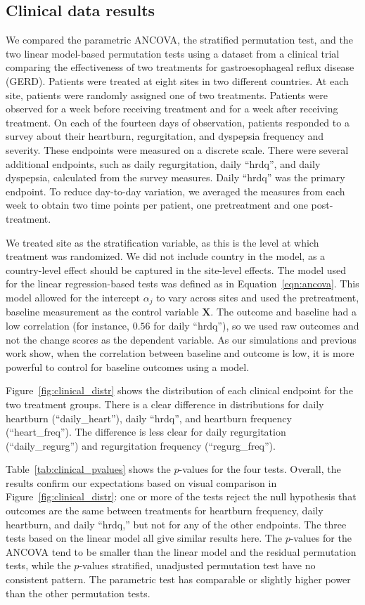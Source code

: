 \documentclass[11pt]{article}
\begin{document}
\subsection*{Clinical data results}
We compared the parametric ANCOVA, the stratified permutation test, and the two linear model-based permutation tests using a dataset from a clinical trial comparing the effectiveness of two treatments for gastroesophageal reflux disease (GERD).
Patients were treated at eight sites in two different countries.
At each site, patients were randomly assigned one of two treatments.
Patients were observed for a week before receiving treatment and for a week after receiving treatment.
On each of the fourteen days of observation, patients responded to a survey about their heartburn, regurgitation, and dyspepsia frequency and severity.
These endpoints were measured on a discrete scale.
There were several additional endpoints, such as daily regurgitation, daily ``hrdq'', and daily dyspepsia, calculated from the survey measures.
Daily ``hrdq'' was the primary endpoint.
To reduce day-to-day variation, we averaged the measures from each week to obtain two time points per patient, one pretreatment and one post-treatment.

We treated site as the stratification variable, as this is the level at which treatment was randomized.
We did not include country in the model, as a country-level effect should be captured in the site-level effects.
The model used for the linear regression-based tests was defined as in Equation~\ref{eqn:ancova}.
This model allowed for the intercept $\alpha_j$ to vary across sites and used the pretreatment, baseline measurement as the control variable $\mathbf{X}$.
The outcome and baseline had a low correlation (for instance, $0.56$ for daily ``hrdq''), so we used raw outcomes and not the change scores as the dependent variable. 
As our simulations and previous work \cite{frison_repeated_1992} show, when the correlation between baseline and outcome is low, it is more powerful to control for baseline outcomes using a model.

Figure~\ref{fig:clinical_distr} shows the distribution of each clinical endpoint for the two treatment groups.
There is a clear difference in distributions for daily heartburn (``daily\_heart''), daily ``hrdq'', and heartburn frequency (``heart\_freq'').
The difference is less clear for daily regurgitation (``daily\_regurg'') and regurgitation frequency (``regurg\_freq'').

Table~\ref{tab:clinical_pvalues} shows the $p$-values for the four tests.
Overall, the results confirm our expectations based on visual comparison in Figure~\ref{fig:clinical_distr}:
one or more of the tests reject the null hypothesis that outcomes are the same between treatments for heartburn frequency, daily heartburn, and daily ``hrdq,''
but not for any of the other endpoints.
The three tests based on the linear model all give similar results here.
The $p$-values for the ANCOVA tend to be smaller than the linear model and the residual permutation tests, while the $p$-values stratified, unadjusted permutation test have no consistent pattern.
The parametric test has comparable or slightly higher power than the other permutation tests.
\end{document}
